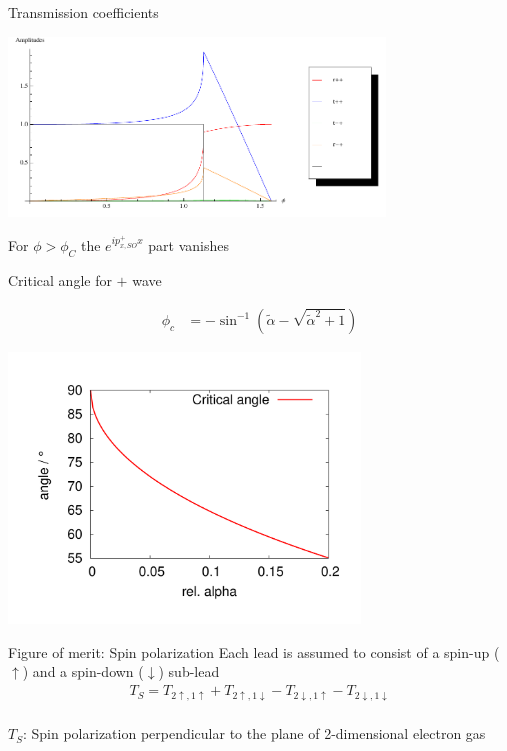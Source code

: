 \documentclass{beamer}
\newcommand{\ta}{\ensuremath{\tilde\alpha}}
\begin{document}
\begin{frame}{Transmission coefficients}
    \begin{center}
        \includegraphics[width=10.0cm]{zero-plus.pdf}

        For $\phi > \phi_C$ the $e^{i p_{x,SO}^+ x }$ part vanishes
    \end{center}
\end{frame}

\begin{frame}{Critical angle for $+$ wave}
    \begin{center}
        \begin{align*}
            \phi_c          &= -\sin ^{-1}\left(\ta-\sqrt{\ta^2+1}\right)
        \end{align*}

        \includegraphics[width=0.7\textwidth]{critical-angle.pdf}
    \end{center}
\end{frame}

\begin{frame}{Figure of merit: Spin polarization}
    Each lead is assumed to consist of a spin-up ($\uparrow$) and a
    spin-down ($\downarrow$) sub-lead\\[2em]

    {
        \huge
        \begin{align*}
            T_S = T_{2\uparrow, 1\uparrow} + T_{2\uparrow, 1\downarrow}
            - T_{2\downarrow, 1\uparrow} - T_{2\downarrow, 1\downarrow}\\
        \end{align*}
    }

    $T_S$: Spin polarization perpendicular to the plane of 2-dimensional
    electron gas

\end{frame}
\end{document}
